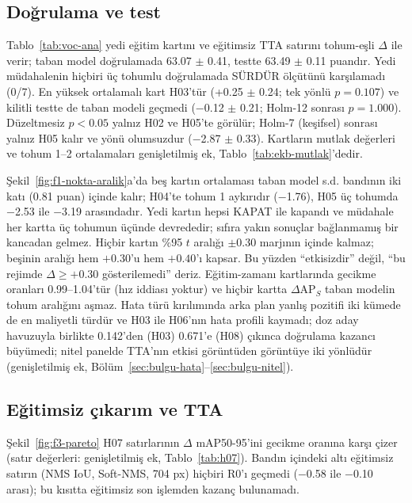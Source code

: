 \documentclass[pdflatex,iicol,sn-mathphys-num]{sn-jnl}
\begin{document}
\subsection{Doğrulama ve test}\label{sec:bulgu-sira}\label{sec:bulgu-ablasyon}
Tablo~\ref{tab:voc-ana} yedi eğitim kartını ve eğitimsiz TTA satırını tohum-eşli $\Delta$ ile verir; taban model doğrulamada 63.07 $\pm$ 0.41, testte 63.49 $\pm$ 0.11 puandır. Yedi müdahalenin hiçbiri üç tohumlu doğrulamada SÜRDÜR ölçütünü karşılamadı (0/7). En yüksek ortalamalı kart H03'tür (+0.25 $\pm$ 0.24; tek yönlü $p=0.107$) ve kilitli testte de taban modeli geçmedi ($-$0.12 $\pm$ 0.21; Holm-12 sonrası $p=1.000$). Düzeltmesiz $p<0.05$ yalnız H02 ve H05'te görülür; Holm-7 (keşifsel) sonrası yalnız H05 kalır ve yönü olumsuzdur ($-$2.87 $\pm$ 0.33). Kartların mutlak değerleri ve tohum 1--2 ortalamaları genişletilmiş ek, Tablo~\ref{tab:ekb-mutlak}'dedir.



Şekil~\ref{fig:f1-nokta-aralik}a'da beş kartın ortalaması taban model s.d. bandının iki katı (0.81 puan) içinde kalır; H04'te tohum 1 aykırıdır ($-$1.76), H05 üç tohumda $-$2.53 ile $-$3.19 arasındadır. Yedi kartın hepsi KAPAT ile kapandı ve müdahale her kartta üç tohumun üçünde devrededir; sıfıra yakın sonuçlar bağlanmamış bir kancadan gelmez. Hiçbir kartın \%95 $t$ aralığı $\pm$0.30 marjının içinde kalmaz; beşinin aralığı hem $+0.30$'u hem $+0.40$'ı kapsar. Bu yüzden ``etkisizdir'' değil, ``bu rejimde $\Delta\ge+0.30$ gösterilemedi'' deriz. Eğitim-zamanı kartlarında gecikme oranları 0.99--1.04'tür (hız iddiası yoktur) ve hiçbir kartta $\Delta$AP$_S$ taban modelin tohum aralığını aşmaz. Hata türü kırılımında arka plan yanlış pozitifi iki kümede de en maliyetli türdür ve H03 ile H06'nın hata profili kaymadı; doz aday havuzuyla birlikte 0.142'den (H03) 0.671'e (H08) çıkınca doğrulama kazancı büyümedi; nitel panelde TTA'nın etkisi görüntüden görüntüye iki yönlüdür (genişletilmiş ek, Bölüm~\ref{sec:bulgu-hata}--\ref{sec:bulgu-nitel}).



\subsection{Eğitimsiz çıkarım ve TTA}\label{sec:bulgu-gecikme}
Şekil~\ref{fig:f3-pareto} H07 satırlarının $\Delta$ mAP50-95'ini gecikme oranına karşı çizer (satır değerleri: genişletilmiş ek, Tablo~\ref{tab:h07}). Bandın içindeki altı eğitimsiz satırın (NMS IoU, Soft-NMS, 704 px) hiçbiri R0'ı geçmedi ($-$0.58 ile $-$0.10 arası); bu kısıtta eğitimsiz son işlemden kazanç bulunamadı.
\end{document}
